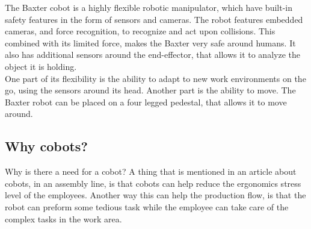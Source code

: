 The Baxter cobot is a highly flexible robotic manipulator, which have built-in safety features in the form of sensors and cameras. The robot features embedded cameras, and force recognition, to recognize and act upon collisions. This combined with its limited force, makes the Baxter very safe around humans. 
It also has additional sensors around the end-effector, that allows it to analyze the object it is holding. \\
One part of its flexibility is the ability to adapt to new work environments on the go, using the sensors around its head. Another part is the ability to move. The Baxter robot can be placed on a four legged pedestal, that allows it to move around. \\


\subsection{Why cobots?}\label{ch:Whycobot}
Why is there a need for a cobot? A thing that is mentioned in an article about cobots, in an assembly line, is that cobots can help reduce the ergonomics stress level of the employees\cite{Coboau}. Another way this can help the production flow, is that the robot can preform some tedious task while the employee can take care of the complex tasks in the work area.\\







